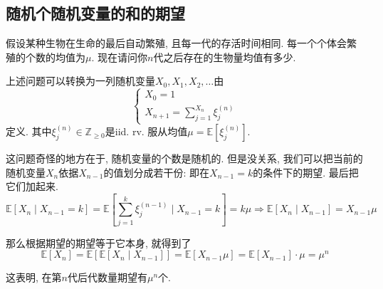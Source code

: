 \documentclass{ctexart}
\begin{document}
\subsection{随机个随机变量的和的期望}

假设某种生物在生命的最后自动繁殖, 且每一代的存活时间相同. 每一个个体会繁殖的个数的均值为$\mu$. 现在请问你$n$代之后存在的生物量均值有多少. 

上述问题可以转换为一列随机变量$X_0, X_1, X_2, \ldots$由
$$
\begin{cases}
X_{0}=1\\
X_{n+1}=\sum_{j=1}^{X_{n}}\xi_{j}^{(n)}
\end{cases}
$$
定义. 其中$\xi_j^{(n)} \in \mathbb{Z}_{\geq 0}$是iid. rv. 服从均值$\mu=\mathbb{E}\left[\xi_j^{(n)}\right]$. 

这问题奇怪的地方在于, 随机变量的个数是随机的. 但是没关系, 我们可以把当前的随机变量$X_n$依据$X_{n-1}$的值划分成若干份: 即在$X_{n-1}=k$的条件下的期望. 最后把它们加起来. 
$$
\mathbb{E}\left[X_n \mid X_{n-1}=k\right]=\mathbb{E}\left[\sum_{j=1}^k \xi_j^{(n-1)} \mid X_{n-1}=k\right]=k \mu \Longrightarrow \mathbb{E}\left[X_n \mid X_{n-1}\right]=X_{n-1} \mu
$$

那么根据期望的期望等于它本身, 就得到了
$$
\mathbb{E}\left[X_n\right]=\mathbb{E}\left[\mathbb{E}\left[X_n \mid X_{n-1}\right]\right]=\mathbb{E}\left[X_{n-1} \mu\right]=\mathbb{E}\left[X_{n-1}\right] \cdot \mu=\mu^n
$$

这表明, 在第$n$代后代数量期望有$\mu^n$个.





\end{document}

